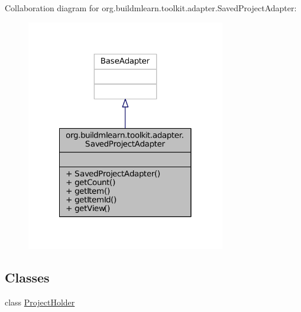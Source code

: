 Collaboration diagram for org.\-buildmlearn.\-toolkit.\-adapter.\-Saved\-Project\-Adapter\-:
\nopagebreak
\begin{figure}[H]
\begin{center}
\leavevmode
\includegraphics[width=246pt]{dc/d9e/classorg_1_1buildmlearn_1_1toolkit_1_1adapter_1_1SavedProjectAdapter__coll__graph}
\end{center}
\end{figure}
\subsection*{Classes}
\begin{DoxyCompactItemize}
\item 
class \hyperlink{classorg_1_1buildmlearn_1_1toolkit_1_1adapter_1_1SavedProjectAdapter_1_1ProjectHolder}{Project\-Holder}
\end{DoxyCompactItemize}
